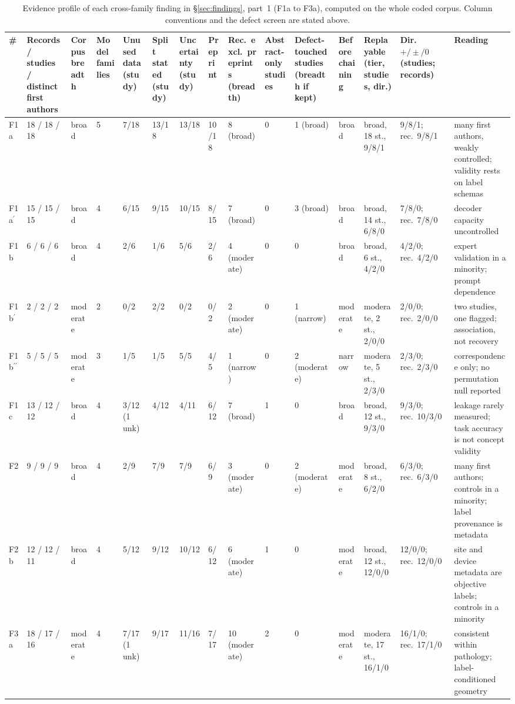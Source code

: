 \begin{table}
\centering\scriptsize\setlength\tabcolsep{2pt}\renewcommand{\arraystretch}{1.0}
\caption{Evidence profile of each cross-family finding in \S\ref{sec:findings}, part~1 (F1a to F3a), computed on the whole coded corpus. Column conventions and the defect screen are stated above.}
\label{tab:profile}
\begin{tabular}{@{}L{0.68cm}C{1.15cm}C{1.40cm}C{0.79cm}C{0.91cm}C{1.03cm}C{0.91cm}C{1.46cm}C{0.91cm}C{1.46cm}C{1.22cm}C{1.35cm}C{1.80cm}C{0.91cm}L{2.29cm}@{}}
\toprule
\# & Records / studies / distinct first authors & Corpus breadth & Model families & Unused data (study) & Split stated (study) & Uncertainty (study) &  Preprint & Rec.\ excl.\ preprints (breadth) & Abstract-only studies & Defect-touched studies (breadth if kept) & Before chaining & Replayable (tier, studies, dir.) & Dir. $+/\pm/0$ (studies; records) & Reading \\
\midrule
F1a & 18 / 18 / 18 & broad & 5 & 7/18 & 13/18 & 13/18 & 10/18 & 8 (broad) & 0 & 1 (broad) & broad & broad, 18 st., 9/8/1 & 9/8/1; rec.\ 9/8/1 & many first authors, weakly controlled; validity rests on label schemas \\
F1a$^{\prime}$ & 15 / 15 / 15 & broad & 4 & 6/15 & 9/15 & 10/15 & 8/15 & 7 (broad) & 0 & 3 (broad) & broad & broad, 14 st., 6/8/0 & 7/8/0; rec.\ 7/8/0 & decoder capacity uncontrolled \\
F1b & 6 / 6 / 6 & broad & 4 & 2/6 & 1/6 & 5/6 & 2/6 & 4 (moderate) & 0 & 0 & broad & broad, 6 st., 4/2/0 & 4/2/0; rec.\ 4/2/0 & expert validation in a minority; prompt dependence \\
F1b$^{\prime}$ & 2 / 2 / 2 & moderate & 2 & 0/2 & 2/2 & 0/2 & 0/2 & 2 (moderate) & 0 & 1 (narrow) & moderate & moderate, 2 st., 2/0/0 & 2/0/0; rec.\ 2/0/0 & two studies, one flagged; association, not recovery \\
F1b$^{\prime\prime}$ & 5 / 5 / 5 & moderate & 3 & 1/5 & 1/5 & 5/5 & 4/5 & 1 (narrow) & 0 & 2 (moderate) & narrow & moderate, 5 st., 2/3/0 & 2/3/0; rec.\ 2/3/0 & correspondence only; no permutation null reported \\
F1c & 13 / 12 / 12 & broad & 4 & 3/12 (1 unk) & 4/12 & 4/11 & 6/12 & 7 (broad) & 1 & 0 & broad & broad, 12 st., 9/3/0 & 9/3/0; rec.\ 10/3/0 & leakage rarely measured; task accuracy is not concept validity \\
F2 & 9 / 9 / 9 & broad & 4 & 2/9 & 7/9 & 7/9 & 6/9 & 3 (moderate) & 0 & 2 (moderate) & moderate & broad, 8 st., 6/2/0 & 6/3/0; rec.\ 6/3/0 & many first authors; controls in a minority; label provenance is metadata \\
F2b & 12 / 12 / 11 & broad & 4 & 5/12 & 9/12 & 10/12 & 6/12 & 6 (moderate) & 1 & 0 & moderate & broad, 12 st., 12/0/0 & 12/0/0; rec.\ 12/0/0 & site and device metadata are objective labels; controls in a minority \\
F3a & 18 / 17 / 16 & moderate & 4 & 7/17 (1 unk) & 9/17 & 11/16 & 7/17 & 10 (moderate) & 2 & 0 & moderate & moderate, 17 st., 16/1/0 & 16/1/0; rec.\ 17/1/0 & consistent within pathology; label-conditioned geometry \\
\bottomrule
\end{tabular}
\end{table}
